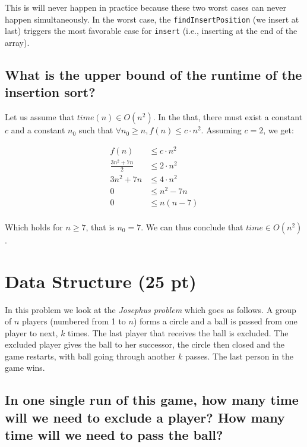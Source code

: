 \documentclass[11pt]{article}
\begin{document}
This is will never happen in practice because these two worst
cases can never happen simultaneously. In the worst case, the
\texttt{findInsertPosition} (we insert at last) triggers the most
favorable case for \texttt{insert} (i.e., inserting at the end of the
array).

\subsection{What is the upper bound of the runtime of the insertion sort?}
\label{sec:org0adfa8b}

Let us assume that \(time(n) \in O(n^2)\). In the that, there must
exist a constant \(c\) and a constant \(n_0\) such that \(\forall n_0
   \geq n, f(n) \leq c \cdot n^2\). Assuming \(c=2\), we get:

\begin{align*}
     f(n) & \leq c \cdot n^2 \\
     \frac{3n^2 + 7n}{2}  & \leq 2 \cdot n^2 \\
     3n^2 + 7n  & \leq 4 \cdot n^2 \\
     0  & \leq n^2 - 7n \\
     0 & \leq n (n-7) \\
\end{align*}

Which holds for \(n \geq 7\), that is \(n_0=7\). We can thus conclude
that \(time \in O(n^2)\).


\section{Data Structure (25 pt)}
\label{sec:org0dc9e00}

In this problem we look at the \emph{Josephus problem} which goes as
follows. A group of \(n\) players (numbered from 1 to \(n\)) forms a
circle and a ball is passed from one player to next, \(k\) times. The
last player that receives the ball is excluded. The excluded player
gives the ball to her successor, the circle then closed and the game
restarts, with ball going through another \(k\) passes. The last person
in the game wins.


\subsection{In one single run of this game, how many time will we need to exclude a player? How many time will we need to pass the ball?}
\label{sec:org78a869a}
\end{document}

